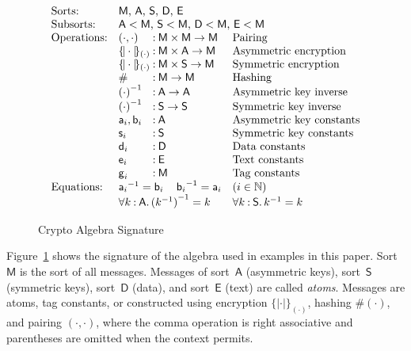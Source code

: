 \documentclass[12pt]{article}
\newcommand{\cn}[1]{\ensuremath{\operatorname{\mathsf{#1}}}}
\newcommand{\srt}[1]{\ensuremath{\mathsf{#1}}}
\newcommand{\typ}{\mathbin:}
\newcommand{\enc}[2]{\ensuremath{\{\!|#1|\!\}_{#2}}}
\newcommand{\invk}[1]{{#1}^{-1}}
\newcommand{\tg}[1]{\cn{g}_{#1}}
\newcommand{\nat}{\ensuremath{\mathbb{N}}}
\newcommand{\all}[1]{\forall#1\mathpunct.}
\begin{document}
\begin{figure}
$$\begin{array}{ll@{{}\typ{}}ll}
\mbox{Sorts:}&
\multicolumn{3}{l}{\mbox{$\srt{M}$, $\srt{A}$,
    $\srt{S}$, $\srt{D}$, $\srt{E}$}}\\
\mbox{Subsorts:}&
\multicolumn{3}{l}{\mbox{$\srt{A}<\srt{M}$, $\srt{S}<\srt{M}$,
    $\srt{D}<\srt{M}$, $\srt{E}<\srt{M}$}}\\
\mbox{Operations:}&(\cdot,\cdot)&\srt{M}\times\srt{M}\to\srt{M}& \mbox{Pairing}\\
&\enc{\cdot}{(\cdot)}&\srt{M}\times\srt{A}\to\srt{M}&\mbox{Asymmetric encryption}\\
&\enc{\cdot}{(\cdot)}&\srt{M}\times\srt{S}\to\srt{M}&\mbox{Symmetric encryption}\\
&\#&\srt{\srt{M}}\to\srt{M}& \mbox{Hashing}\\
&\invk{(\cdot)}&\srt{A}\to\srt{A}& \mbox{Asymmetric key inverse}\\
&\invk{(\cdot)}&\srt{S}\to\srt{S}& \mbox{Symmetric key inverse}\\
&\cn{a}_i,\cn{b}_i&\srt{A}& \mbox{Asymmetric key constants}\\
&\cn{s}_i&\srt{S}& \mbox{Symmetric key constants}\\
&\cn{d}_i&\srt{D}& \mbox{Data constants}\\
&\cn{e}_i&\srt{E}& \mbox{Text constants}\\
&\tg{i}&\srt{M}& \mbox{Tag constants}\\
\mbox{Equations:}&\multicolumn{2}{l}{\invk{\cn{a}_i}=\cn{b}_i\quad
\invk{\cn{b}_i}=\cn{a}_i}
&(i\in\nat)\\
&\multicolumn{2}{l}{\all{k\typ\srt{A}}\invk{(\invk{k})}=k}
&\all{k\typ\srt{S}}\invk{k}=k
\end{array}$$
\caption{Crypto Algebra Signature}\label{fig:algebra signature}
\end{figure}

Figure~\ref{fig:algebra signature} shows the signature of the algebra
used in examples in this paper.  Sort~$\srt{M}$ is the sort of all
messages.  Messages of sort~$\srt{A}$ (asymmetric keys),
sort~$\srt{S}$ (symmetric keys), sort~$\srt{D}$ (data), and
sort~$\srt{E}$ (text) are called \emph{atoms}.  Messages are atoms,
tag constants, or constructed using encryption $\enc{\cdot}{(\cdot)}$,
hashing $\#(\cdot)$, and pairing $(\cdot,\cdot)$, where the comma
operation is right associative and parentheses are omitted when the
context permits.
\end{document}
